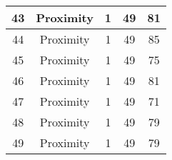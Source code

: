 \documentclass[results.tex]{subfiles}
\begin{document}
\begin{center}
\begin{tabular}{| c || c | c | c | c |}
            \hline
            43                      & Proximity                    & 1                      & 49                      & 81                   \\
            \hline
            44                      & Proximity                    & 1                      & 49                      & 85                   \\
            \hline
            45                      & Proximity                    & 1                      & 49                      & 75                   \\
            \hline
            46                      & Proximity                    & 1                      & 49                      & 81                   \\
            \hline
            47                      & Proximity                    & 1                      & 49                      & 71                   \\
            \hline
            48                      & Proximity                    & 1                      & 49                      & 79                   \\
            \hline
            49                      & Proximity                    & 1                      & 49                      & 79                   \\
            \hline
        \end{tabular}
    \end{center}
\end{document}
